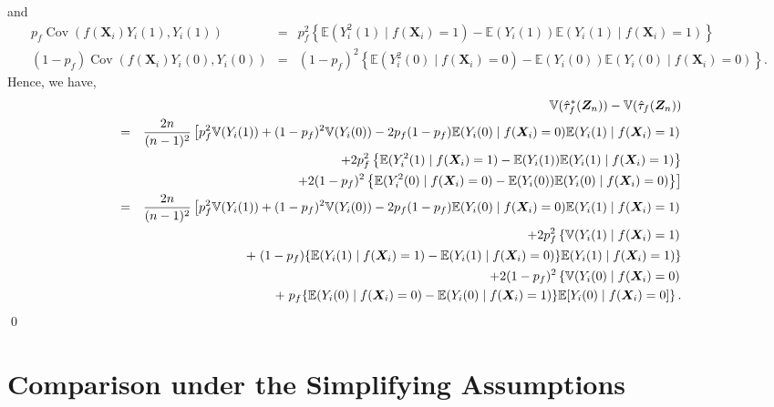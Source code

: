 \documentclass[USenglish,onecolumn]{article}
\DeclareMathOperator\Cov{Cov}
\renewcommand\r{\right}
\renewcommand\l{\left}
\newcommand\E{\mathbb{E}}
\newcommand\V{\mathbb{V}}
\newcommand\bX{\bm{X}}
\newcommand\bZ{\bm{Z}}
\begin{document}
and
\begin{eqnarray*}
	p_f\Cov (f(\bX_i)Y_i(1),Y_i(1))
	&=& p_f^2 \l\{\E(Y_i^2(1) \mid f(\bX_i) = 1) -
	\E(Y_i(1))\E(Y_i(1) \mid f(\bX_i) =1)\r\} \\
	(1-p_f)\Cov (f(\bX_i)Y_i(0),Y_i(0))
	&=& (1-p_f)^2 \l\{\E(Y_i^2(0) \mid f(\bX_i) = 0) -
	\E(Y_i(0))\E(Y_i(0) \mid f(\bX_i) =0)\r\}.
\end{eqnarray*}
Hence, we have,
\begin{eqnarray*}
	& &\V(\hat{\tau}_f^*(\bZ_n))-\V(\hat{\tau}_f(\bZ_n)) \\
	& = & \frac{2n}{(n-1)^2}\l[p_f^2\V(Y_i(1))+(1-p_f)^2\V(Y_i(0))
	-2p_f(1-p_f)\E(Y_i(0) \mid f(\bX_i)=0)\E(Y_i(1)\mid f(\bX_i)=1) \r. \nonumber\\
	& & \hspace{.5in} +  2 p_f^2 \l\{\E(Y_i^2(1) \mid f(\bX_i) = 1) -
	\E(Y_i(1))\E(Y_i(1) \mid f(\bX_i) =1)\r\}\\
	& & \l. \hspace{.5in} +  2(1-p_f)^2 \l\{\E(Y_i^2(0) \mid f(\bX_i) = 0) -
	\E(Y_i(0))\E(Y_i(0) \mid f(\bX_i) =0)\r\} \r] \nonumber\\
	& = & \frac{2n}{(n-1)^2}\l[p_f^2\V(Y_i(1))+(1-p_f)^2\V(Y_i(0))
	-2p_f(1-p_f)\E(Y_i(0) \mid f(\bX_i)=0)\E(Y_i(1)\mid f(\bX_i)=1) \r. \nonumber\\
	& & \hspace{.5in} +  2 p_f^2 \l\{\V(Y_i(1) \mid f(\bX_i) = 1)
	\r.\\ & & +\l. (1-p_f)\{\E(Y_i(1)\mid f(\bX_i)=1)
	-\E(Y_i(1)\mid f(\bX_i)=0)\} \E(Y_i(1) \mid f(\bX_i) =1)\r\} \\
	& & \hspace{.5in} +  2 (1-p_f)^2 \l\{\V(Y_i(0) \mid f(\bX_i) = 0)
	\r.\\ & & \hspace{.75in} +\l. p_f\{\E(Y_i(0)\mid f(\bX_i)=0)
	-\E(Y_i(0)\mid f(\bX_i)=1)\} \E[Y_i(0) \mid f(\bX_i) =0]\r\}.
\end{eqnarray*}
\qed

\section{Comparison under the Simplifying Assumptions}
\label{app:comp_simple}
\end{document}
